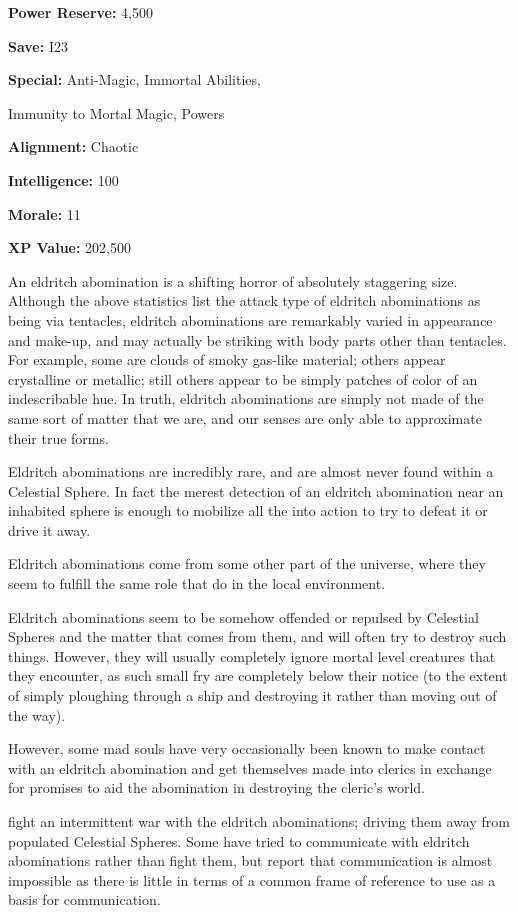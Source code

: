 \begin{multicols*}{2}
{\textbf{Power Reserve:} 4,500

\textbf{Save:} I23

\textbf{Special:} Anti-Magic, Immortal Abilities, 

Immunity to Mortal Magic, Powers

\textbf{Alignment:} Chaotic

\textbf{Intelligence:} 100

\textbf{Morale:} 11

\textbf{XP Value:} 202,500}

An eldritch abomination is a shifting horror of absolutely staggering size. Although the above statistics list the attack type of eldritch abominations as being via tentacles, eldritch abominations are remarkably varied in appearance and make-up, and may actually be striking with body parts other than tentacles. For example, some are clouds of smoky gas-like material; others appear crystalline or metallic; still others appear to be simply patches of color of an indescribable hue. In truth, eldritch abominations are simply not made of the same sort of matter that we are, and our senses are only able to approximate their true forms.

Eldritch abominations are incredibly rare, and are almost never found within a Celestial Sphere. In fact the merest detection of an eldritch abomination near an inhabited sphere is enough to mobilize all the  into action to try to defeat it or drive it away.

Eldritch abominations come from some other part of the universe, where they seem to fulfill the same role that  do in the local environment.

Eldritch abominations seem to be somehow offended or repulsed by Celestial Spheres and the matter that comes from them, and will often try to destroy such things. However, they will usually completely ignore mortal level creatures that they encounter, as such small fry are completely below their notice (to the extent of simply ploughing through a ship and destroying it rather than moving out of the way).

However, some mad souls have very occasionally been known to make contact with an eldritch abomination and get themselves made into clerics in exchange for promises to aid the abomination in destroying the cleric’s world.

 fight an intermittent war with the eldritch abominations; driving them away from populated Celestial Spheres. Some  have tried to communicate with eldritch abominations rather than fight them, but report that communication is almost impossible as there is little in terms of a common frame of reference to use as a basis for communication.


\end{multicols*}
